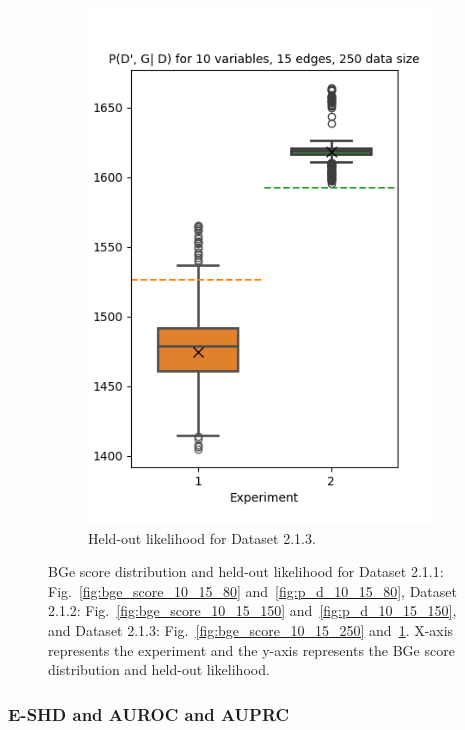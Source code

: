 \documentclass{lxaiproposal}
\begin{document}
\begin{figure}[h]
\begin{subfigure}{0.32\textwidth}
            \includegraphics[width=\textwidth]{figures/P_d_prime_10_15_250}
            \caption{Held-out likelihood for Dataset 2.1.3.}
            \label{fig:p_d_10_15_250}
        \end{subfigure}
        \caption{BGe score distribution and held-out likelihood for Dataset 2.1.1: Fig.~\ref{fig:bge_score_10_15_80} and~\ref{fig:p_d_10_15_80}, Dataset 2.1.2: Fig.~\ref{fig:bge_score_10_15_150} and~\ref{fig:p_d_10_15_150}, and Dataset
        2.1.3: Fig.~\ref{fig:bge_score_10_15_250} and~\ref{fig:p_d_10_15_250}. X-axis represents the experiment and
        the y-axis represents the BGe score distribution and held-out likelihood.}
        \label{fig:illustration_10_15}
    \end{figure}

    \subsubsection{E-SHD and AUROC and AUPRC}
\end{document}
